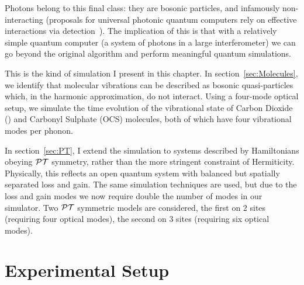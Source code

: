 Photons belong to this final class: they are bosonic particles, and infamously
non-interacting (proposals for universal photonic quantum computers rely on
effective interactions via detection~\cite{klm}). The implication of this is
that with a relatively simple quantum computer (a system of photons in a large
interferometer) we can go beyond the original \bosonsampling{} algorithm and
perform meaningful quantum simulations.

This is the kind of simulation I present in this chapter. In
section~\ref{sec:Molecules}, we identify that molecular vibrations can be
described as bosonic quasi-particles which, in the harmonic approximation, do
not interact. Using a four-mode optical setup, we simulate the time evolution
of the vibrational state of Carbon Dioxide (\co) and Carbonyl Sulphate (OCS)
molecules, both of which have four vibrational modes per phonon.

In section~\ref{sec:PT}, I extend the simulation to systems described by
Hamiltonians obeying \(\mathcal{PT}\) symmetry, rather than the more stringent
constraint of Hermiticity. Physically, this reflects an open quantum system
with balanced but spatially separated loss and gain. The same simulation
techniques are used, but due to the loss and gain modes we now require
double the number of modes in our simulator. Two \(\mathcal{PT}\) symmetric models are
considered, the first on 2 sites (requiring four optical modes), the second on
3 sites (requiring six optical modes).

\section{Experimental Setup}
